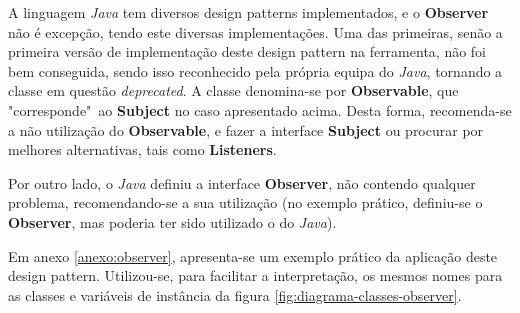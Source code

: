\hspace{5mm} A linguagem \textit{Java} tem diversos design patterns implementados, e o \textbf{Observer} não é excepção, tendo este diversas implementações. Uma das primeiras, senão a primeira versão de implementação deste design pattern na ferramenta, não foi bem conseguida, sendo isso reconhecido pela própria equipa do \textit{Java}, tornando a classe em questão \textit{deprecated}. A classe denomina-se por \textbf{Observable}, que "corresponde"\ ao \textbf{Subject} no caso apresentado acima. Desta forma, recomenda-se a não utilização do \textbf{Observable}, e fazer a interface \textbf{Subject} ou procurar por melhores alternativas, tais como \textbf{Listeners}.


\hspace{5mm} Por outro lado, o \textit{Java} definiu a interface \textbf{Observer}, não contendo qualquer problema, recomendando-se a sua utilização (no exemplo prático, definiu-se o \textbf{Observer}, mas poderia ter sido utilizado o do \textit{Java}).

\hspace{2mm} Em anexo \ref{anexo:observer}, apresenta-se um exemplo prático da aplicação deste design pattern. Utilizou-se, para facilitar a interpretação, os mesmos nomes para as classes e variáveis de instância da figura \ref{fig:diagrama-classes-observer}.
